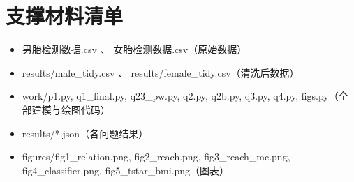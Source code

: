 \documentclass[12pt,a4paper]{article}
\begin{document}
\section{支撑材料清单}
\begin{itemize}
\item 男胎检测数据.csv 、 女胎检测数据.csv（原始数据）
\item results/male\_tidy.csv 、 results/female\_tidy.csv（清洗后数据）
\item work/p1.py, q1\_final.py, q23\_pw.py, q2.py, q2b.py, q3.py, q4.py, figs.py（全部建模与绘图代码）
\item results/*.json（各问题结果）
\item figures/fig1\_relation.png, fig2\_reach.png, fig3\_reach\_mc.png, fig4\_classifier.png, fig5\_tstar\_bmi.png（图表）
\end{itemize}
\end{document}
